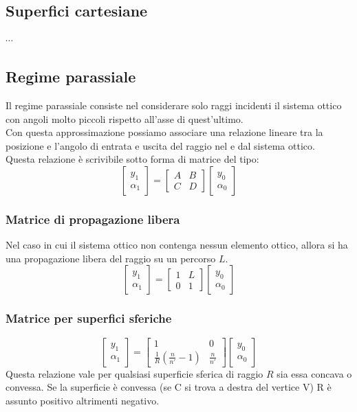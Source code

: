 \documentclass{article}
\theoremstyle{remark}
\begin{document}
\subsection*{Superfici cartesiane}
$\cdots$

\subsection*{Regime parassiale}
Il regime parassiale consiste nel considerare solo raggi incidenti il sistema ottico con angoli molto piccoli rispetto all'asse di quest'ultimo.\\
Con questa approssimazione possiamo associare una relazione lineare tra la posizione e l'angolo di entrata e uscita del raggio nel e dal sistema ottico.\\
Questa relazione è scrivibile sotto forma di matrice del tipo:
\[
\begin{bmatrix}
y_1\\
\alpha_1
\end{bmatrix}
=
\begin{bmatrix}
A	&	B\\
C	&	D
\end{bmatrix}
\begin{bmatrix}
y_0\\
\alpha_0
\end{bmatrix}
\]

\subsubsection*{Matrice di propagazione libera}
Nel caso in cui il sistema ottico non contenga nessun elemento ottico, allora si ha una propagazione libera del raggio su un percorso $L$.
\[
\begin{bmatrix}
y_1\\
\alpha_1
\end{bmatrix}
=
\begin{bmatrix}
1	&	L\\
0	&	1
\end{bmatrix}
\begin{bmatrix}
y_0\\
\alpha_0
\end{bmatrix}
\]

\subsubsection*{Matrice per superfici sferiche}
\[
\begin{bmatrix}
y_1\\
\alpha_1
\end{bmatrix}
=
\begin{bmatrix}
1	&	0\\
\frac{1}{R}(\frac{n}{n'}-1)	&	\frac{n}{n'}
\end{bmatrix}
\begin{bmatrix}
y_0\\
\alpha_0
\end{bmatrix}
\]
Questa relazione vale per qualsiasi superficie sferica di raggio $R$ sia essa concava o convessa. Se la superficie è convessa (se C si trova a destra del vertice V) R è assunto positivo altrimenti negativo.
\end{document}
